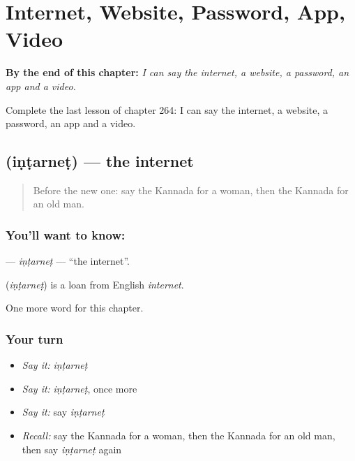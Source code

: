
\chapter{Internet, Website, Password, App, Video}
\label{ch:ka-internet-website-password-app-video}

\begin{chapteropening}
\textbf{By the end of this chapter:} \emph{I can say the internet, a website, a password, an app and a video.}

Complete the last lesson of chapter 264: I can say the internet, a website, a password, an app and a video.
\end{chapteropening}

\section[\texorpdfstring{\kn{ಇಂಟರ್ನೆಟ್} (iṇṭarneṭ)}{ಇಂಟರ್ನೆಟ್ (iṇṭarneṭ)}]{ (iṇṭarneṭ) — the internet}

\label{lesson:KA-C264-intarnet}



\begin{quote}
Before the new one: say the Kannada for a woman, then the Kannada for an old man.
\end{quote}

\subsection*{You'll want to know: }
\textbf{} — \emph{iṇṭarneṭ} — \textquotedblleft{}the internet\textquotedblright{}.

\begin{cousinweb}
\textbf{} (\emph{iṇṭarneṭ}) is a loan from English \emph{internet}.
\end{cousinweb}

\begin{grammarlens}[title={What you've built}]
One more word for this chapter.
\end{grammarlens}

\subsection*{Your turn}
\begin{itemize}
\raggedright
  \item \emph{Say it:} \emph{iṇṭarneṭ}
  \item \emph{Say it:} \emph{iṇṭarneṭ}, once more
  \item \emph{Say it:} say \emph{iṇṭarneṭ}
  \item \emph{Recall:} say the Kannada for a woman, then the Kannada for an old man, then say \emph{iṇṭarneṭ} again
\end{itemize}

